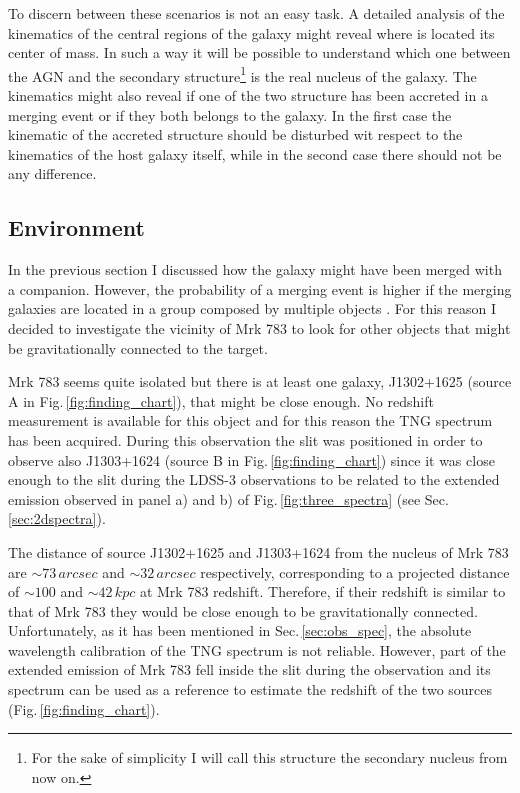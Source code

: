 \documentclass[../main.tex]{subfiles}
\begin{document}
To discern between these scenarios is not an easy task.
A detailed analysis of the kinematics of the central regions of the galaxy might reveal where is located its center of mass.
In such a way it will be possible to understand which one between the AGN and the secondary structure\footnote{For the sake of simplicity I will call this structure the secondary nucleus from now on.} is the real nucleus of the galaxy.
The kinematics might also reveal if one of the two structure has been accreted in a merging event or if they both belongs to the galaxy.
In the first case the kinematic of the accreted structure should be disturbed wit respect to the kinematics of the host galaxy itself, while in the second case there should not be any difference.

\subsection{Environment}
\label{sec:environment}

In the previous section I discussed how the galaxy might have been merged with a companion.
However, the probability of a merging event is higher if the merging galaxies are located in a group composed by multiple objects \citep{Kampczyk13}.
For this reason I decided to investigate the vicinity of Mrk 783 to look for other objects that might be gravitationally connected to the target.

Mrk 783 seems quite isolated but there is at least one galaxy, J1302+1625 (source A in Fig.\,\ref{fig:finding_chart}), that might be close enough. 
No redshift measurement is available for this object and for this reason the TNG spectrum has been acquired.
During this observation the slit was positioned in order to observe also J1303+1624 (source B in Fig.\,\ref{fig:finding_chart}) since it was close enough to the slit during the LDSS-3 observations to be related to the extended emission observed in panel a) and b) of Fig.\,\ref{fig:three_spectra} (see Sec.\,\ref{sec:2dspectra}).

The distance of source J1302+1625 and J1303+1624 from the nucleus of Mrk 783 are $\sim 73\,\si{arcsec}$ and $\sim 32\,\si{arcsec}$ respectively, corresponding to a projected distance of $\sim100$ and $\sim42\,\si{kpc}$ at Mrk 783 redshift.
Therefore, if their redshift is similar to that of Mrk 783 they would be close enough to be gravitationally connected.
Unfortunately, as it has been mentioned in Sec.\,\ref{sec:obs_spec}, the absolute wavelength calibration of the TNG spectrum is not reliable.
However, part of the extended emission of Mrk 783 fell inside the slit during the observation and its spectrum can be used as a reference to estimate the redshift of the two sources (Fig.\,\ref{fig:finding_chart}).
\end{document}

